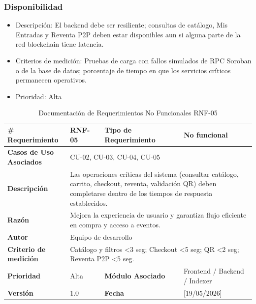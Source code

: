 \documentclass[12pt,letterpaper]{article}
\begin{document}
\subsubsection{Disponibilidad}
\begin{itemize}
    \item Descripción: El backend debe ser resiliente; consultas de catálogo, Mis Entradas y Reventa P2P deben estar disponibles aun si alguna parte de la red blockchain tiene latencia.
    \item Criterios de medición: Pruebas de carga con fallos simulados de RPC Soroban o de la base de datos; porcentaje de tiempo en que los servicios críticos permanecen operativos.
    \item Prioridad: Alta
\end{itemize}
\begin{table}[H]
\centering
\scriptsize
\renewcommand{\arraystretch}{1.2}
\setlength{\tabcolsep}{4pt}

\begin{tabularx}{\textwidth}{|p{3cm}|X|p{3.2cm}|X|}
\hline
\textbf{\# Requerimiento} & RNF-05 & \textbf{Tipo de Requerimiento} & No funcional \\ \hline

\textbf{Casos de Uso Asociados} & \multicolumn{3}{X|}{CU-02, CU-03, CU-04, CU-05} \\ \hline

\textbf{Descripción} & 
\multicolumn{3}{p{\dimexpr\textwidth-6cm-12\tabcolsep-4\arrayrulewidth\relax}|}{Las operaciones críticas del sistema (consultar catálogo, carrito, checkout, reventa, validación QR) deben completarse dentro de los tiempos de respuesta establecidos.} \\ \hline

\textbf{Razón} & 
\multicolumn{3}{p{\dimexpr\textwidth-6cm-12\tabcolsep-4\arrayrulewidth\relax}|}{Mejora la experiencia de usuario y garantiza flujo eficiente en compra y acceso a eventos.} \\ \hline

\textbf{Autor} & \multicolumn{3}{X|}{Equipo de desarrollo} \\ \hline

\textbf{Criterio de medición} & 
\multicolumn{3}{p{\dimexpr\textwidth-6cm-12\tabcolsep-4\arrayrulewidth\relax}|}{Catálogo y filtros <3 seg; Checkout <5 seg; QR <2 seg; Reventa P2P <5 seg.} \\ \hline

\textbf{Prioridad} & Alta & \textbf{Módulo Asociado} & Frontend / Backend / Indexer \\ \hline

\textbf{Versión} & 1.0 & \textbf{Fecha} & [19/05/2026] \\ \hline

\end{tabularx}

\caption{Documentación de Requerimientos No Funcionales RNF-05}
\label{tab:documentacion_rnf05}
\normalsize
\end{table}
\end{document}
